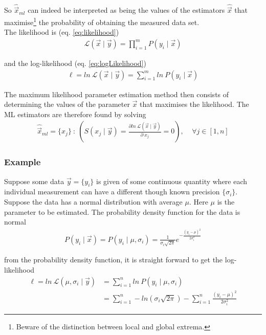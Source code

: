 \documentclass[report,12pt]{report}
\begin{document}
So $\hat{ \vec x}_{ml}$ can indeed be interpreted as being the values of the estimators $\hat{ \vec x}$ that maximise\footnote{Beware of the distinction between local and global extrema.} the probability of obtaining the measured data set.\\

The likelihood is (eq. \ref{eq:likelihood})
\begin{align}
		\mathcal{L}(\vec x \mid \vec y) = 
	\prod_{i=1}^{m} P\left( y_i \mid \vec x \right)
\end{align}

and the log-likelihood (eq. \ref{eq:logLikelihood})
\begin{align}
		\ell = ln\ \mathcal{L} \left( \vec x \mid \vec y \right)
	= \sum_{i=1}^{m} ln\ P(y_i\mid\vec x)
\end{align}

The maximum likelihood parameter estimation method then consists of determining the values of the parameter $\vec x$ that maximises the likelihood. The ML estimators are therefore found by solving
\begin{align}
	\hat{ \vec x}_{ml} = \{{x_j}\}\ : \ \left(
	S(x_j \mid \vec y ) = 
	\frac{\partial ln\ \mathcal{L} (\vec x \mid \vec y)}
	{\partial\ x_j} = 0 \right),\ \ \ \ \ 
	\forall j \in [1,n] 
	\label{eq:ml}
\end{align}




\subsubsection*{Example}
Suppose some data $\vec y = \{y_i\}$ is given of some continuous quantity where each individual measurement can have a different though known precision $\{\sigma_i\}$. Suppose the data has a normal distribution with average $\mu$. Here $\mu$ is the parameter to be estimated. The probability density function for the data is normal
\begin{align}
	P(y_i \mid \vec x) = P(y_i \mid \mu, \sigma_i) = \frac{1}{\sigma_i \sqrt{2 \pi}} 
	e^{-\frac{(y_i-\mu)^2}{2 \sigma_i^2}}
\end{align}

from the probability density function, it is straight forward to get the log-likelihood
\begin{align}
	\ell = ln\ \mathcal{L} \left(\mu, \sigma_i \mid \vec y \right)
	&= \sum_{i=1}^{n} ln\ P(y_i \mid \mu, \sigma_i)
	\nonumber\\
	&= \sum_{i=1}^{n} -ln\left( \sigma_i\sqrt{2\pi}\right) - 
	\sum_{i=1}^{n} \frac{(y_i-\mu)^2}{2 \sigma_i^2}
	\label{eq:mlExample}
\end{align}
\end{document}
